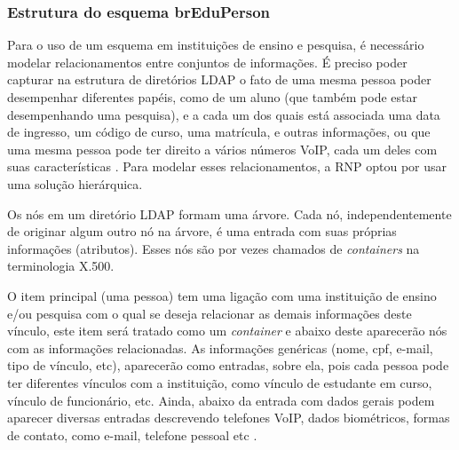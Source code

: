 \subsubsection{Estrutura do esquema brEduPerson}
\label{ss_c2_estrut_breduperson}

Para o uso de um esquema em instituições de ensino e pesquisa, é necessário modelar relacionamentos entre conjuntos de informações. É preciso poder capturar na estrutura de diretórios LDAP o fato de uma mesma pessoa poder desempenhar diferentes papéis, como de um aluno (que também pode estar desempenhando uma pesquisa), e a cada um dos quais está associada uma data de ingresso, um código de curso, uma matrícula, e outras informações, ou que uma mesma pessoa pode ter direito a vários números \acs{VoIP}, cada um deles com suas características \cite{rnp:09}. Para modelar esses relacionamentos, a RNP optou por usar uma solução hierárquica.

Os nós em um diretório LDAP formam uma árvore. Cada nó, independentemente de originar algum outro nó na árvore, é uma entrada com suas próprias informações (atributos). Esses nós são por vezes chamados de \textit{containers} na terminologia X.500.

O item principal (uma pessoa) tem uma ligação com uma instituição de ensino e/ou pesquisa com o qual se deseja relacionar as demais informações deste vínculo, este item será tratado como um \textit{container} e abaixo deste aparecerão nós com as informações relacionadas. As informações genéricas (nome, cpf, e-mail, tipo de vínculo, etc), aparecerão como entradas, sobre ela, pois cada pessoa pode ter diferentes vínculos com a instituição, como vínculo de estudante em curso, vínculo de funcionário, etc. Ainda, abaixo da entrada com dados gerais podem aparecer diversas entradas descrevendo telefones VoIP, dados biométricos, formas de contato, como e-mail, telefone pessoal etc \cite{rnp:09}.

